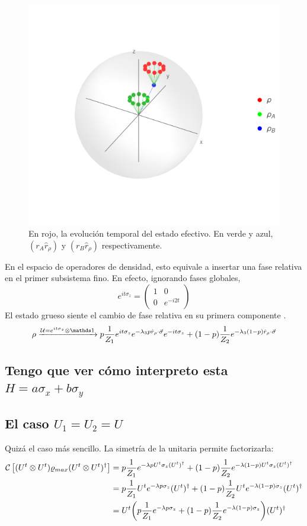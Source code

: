 \begin{figure}[h!]
    \centering
    \includegraphics[width=0.6\linewidth]{maxent/figures/Ux1_H=sigmaz_sequence__z=0.9_p=0.4.png}
    \caption{En rojo, la evolución temporal del estado efectivo. En verde y azul, $(r_{A}\hat{r}_{\rho})$ y $(r_{B}\hat{r}_{\rho})$ respectivamente.}
    \label{fig:ZRot}
\end{figure}

En el espacio de operadores de densidad, esto equivale a insertar una fase relativa en el primer subsistema fino. En efecto, ignorando fases globales,
\begin{equation}
    e^{it\sigma_{z}}=\begin{pmatrix}
        1&0\\0&e^{-i2t}
    \end{pmatrix}
\end{equation}
El estado grueso siente el cambio de fase relativa en su primera componente .
\begin{equation}
    \rho\xrightarrow{\mcU=e^{it\sigma_{z}}\otimes \Id} p\frac{1}{Z_{1}}e^{it\sigma_{z}}e^{-\lambda_{3}p\hat{r}_{\rho}\cdot\vec{\sigma}}e^{-it\sigma_{z}}+(1-p)\frac{1}{Z_{2}}e^{-\lambda_{3}(1-p)\hat{r}_{\rho}\cdot\vec{\sigma}}
\end{equation}


\subsection{Tengo que ver cómo interpreto esta $H=a\sigma_{x}+b\sigma_{y}$}

\subsection{El caso $U_{1}=U_{2}=U$}

Quizá el caso más sencillo. La simetría de la unitaria permite factorizarla:
\begin{align*}
\mathcal{C}\left[(U^{t}\otimes U^{t})\varrho_{max}(U^{t}\otimes U^{t})^{\dag}\right]&=p\frac{1}{Z_{1}}e^{-\lambda p U^{t}\sigma_{z}(U^t)^{\dag}}+(1-p)\frac{1}{Z_{2}}e^{-\lambda (1-p)U^{t}\sigma_{z}(U^t)^{\dag}}\\
&=p\frac{1}{Z_{1}}U^{t}e^{-\lambda p \sigma_{z}}(U^t)^{\dag}+(1-p)\frac{1}{Z_{2}}U^{t}e^{-\lambda (1-p)\sigma_{z}}(U^t)^{\dag}\\
&=U^{t}\qty(p\frac{1}{Z_{1}}e^{-\lambda p \sigma_{z}}+(1-p)\frac{1}{Z_{2}}e^{-\lambda (1-p)\sigma_{z}})(U^t)^{\dag}\\
\end{align*}

\newpage